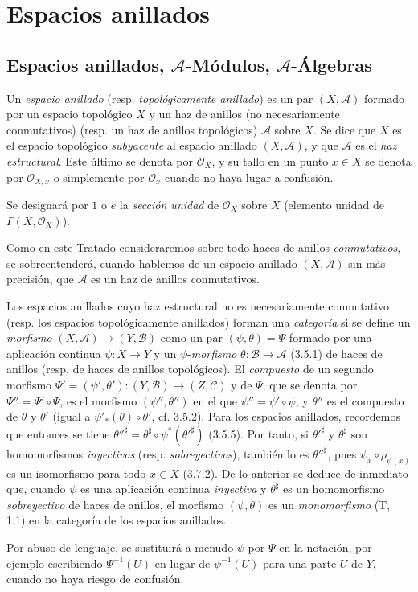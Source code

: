 \section{Espacios anillados}
\label{section:0.4-fr}

\subsection{Espacios anillados, $\mathcal{A}$-Módulos, $\mathcal{A}$-Álgebras}
\label{subsection:0.4.1-fr}

\begin{env}[4.1.1]
\label{0.4.1.1-fr}
Un \emph{espacio anillado} (resp. \emph{topológicamente anillado}) es un par
$(X,\mathcal{A})$ formado por un espacio topológico $X$ y un haz de anillos
(no necesariamente conmutativos) (resp. un haz de anillos topológicos)
$\mathcal{A}$ sobre $X$. Se dice que $X$ es el espacio
topológico \emph{subyacente} al espacio anillado $(X,\mathcal{A})$, y que
$\mathcal{A}$ es el \emph{haz estructural}. Este último se denota por
$\mathcal{O}_X$, y su tallo en un punto $x\in X$ se denota por $\mathcal{O}_{X,x}$
o simplemente por $\mathcal{O}_x$ cuando no haya lugar a confusión.

Se designará por $1$ o $e$ la \emph{sección unidad} de $\mathcal{O}_X$
sobre $X$ (elemento unidad de $\Gamma(X,\mathcal{O}_X)$).

Como en este Tratado consideraremos sobre todo haces de anillos
\emph{conmutativos}, se sobreentenderá, cuando hablemos de un espacio
anillado $(X,\mathcal{A})$ sin más precisión, que $\mathcal{A}$ es un haz
de anillos conmutativos.

Los espacios anillados cuyo haz estructural no es necesariamente conmutativo
(resp. los espacios topológicamente anillados) forman una \emph{categoría}
si se define un \emph{morfismo}
$(X,\mathcal{A})\to(Y,\mathcal{B})$ como un par
$(\psi,\theta)=\Psi$ formado por una aplicación continua $\psi:X\to Y$ y un
$\psi$-\emph{morfismo} $\theta:\mathcal{B}\to\mathcal{A}$ (3.5.1) de
haces de anillos (resp. de haces de anillos topológicos).
El \emph{compuesto} de un segundo morfismo
$\Psi'=(\psi',\theta'):(Y,\mathcal{B})\to(Z,\mathcal{C})$ y de $\Psi$, que se denota
por $\Psi''=\Psi'\circ\Psi$, es el morfismo $(\psi'',\theta'')$ en el que
$\psi''=\psi'\circ\psi$, y $\theta''$ es el compuesto de $\theta$ y $\theta'$
(igual a $\psi'_*(\theta)\circ\theta'$, cf. 3.5.2). Para los espacios
anillados, recordemos que entonces se tiene
$\theta''^\sharp=\theta^\sharp\circ\psi^*(\theta'^\sharp)$ (3.5.5). Por tanto, si
$\theta'^\sharp$ y $\theta^\sharp$ son homomorfismos \emph{inyectivos}
(resp. \emph{sobreyectivos}), también lo es $\theta''^\sharp$, pues
$\psi_x\circ\rho_{\psi(x)}$ es un isomorfismo para todo $x\in X$
(3.7.2). De lo anterior se deduce de inmediato que, cuando $\psi$ es una
aplicación continua \emph{inyectiva} y $\theta^\sharp$ es un homomorfismo
\emph{sobreyectivo} de haces de anillos, el morfismo
$(\psi,\theta)$ es un \emph{monomorfismo} (T, 1.1) en la categoría de los
espacios anillados.

Por abuso de lenguaje, se sustituirá a menudo $\psi$ por $\Psi$ en la
notación, por ejemplo escribiendo $\Psi^{-1}(U)$ en lugar de $\psi^{-1}(U)$
para una parte $U$ de $Y$, cuando no haya riesgo de confusión.
\end{env}
